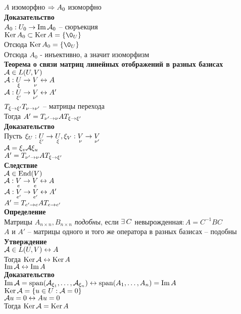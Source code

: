 \documentclass[12pt]{article}
\begin{document}
$A$ изоморфно $\Rightarrow A_0$ изоморфно\\
\textbf{Доказательство}\\
$A_0: U_0 \rightarrow \operatorname{Im} \mathcal{A}_0$ -- сюръекция\\
$\ker A_0 \subset \ker A = \{\0_U\}$\\
Отсюда $\ker A_0 = \{\0_U\}$\\
Отсюда $A_0$ - инъективно, а значит изоморфизм\\
\textbf{Теорема о связи матриц линейных отображений в разных базисах}\\
$\mathcal{A} \in L(U, V)$\\
$\mathcal{A}: \underset{\xi}{U} \rightarrow \underset{\nu}{V} \leftrightarrow A$\\
$\mathcal{A}: \underset{\xi'}{U} \rightarrow \underset{\nu'}{V} \leftrightarrow A'$\\
$T_{\xi \rightarrow \xi'} T_{\nu \rightarrow \nu'}$ -- матрицы перехода\\
Тогда $A' = T_{\nu' \rightarrow \nu} A T_{\xi \rightarrow \xi'}$\\
\textbf{Доказательство}\\
Пусть $\xi_U: \underset{\xi'}{U} \rightarrow \underset{\xi}{U},\\
\xi_V: \underset{\nu}{V} \rightarrow \underset{\nu'}{V}$\\
$\mathcal{A} = \xi_v \mathcal{A} \xi_u$\\
$A' = T_{\nu'\rightarrow \nu}AT_{\xi \rightarrow \xi'}$\\
\textbf{Следствие}\\
$\mathcal{A} \in \operatorname{End}(V)$\\
$\mathcal{A}: \underset{e}{V}\rightarrow\underset{e}{V} \leftrightarrow A$\\
$\mathcal{A}: \underset{e'}{V}\rightarrow\underset{e'}{V} \leftrightarrow A'$\\
$A'=T_{e'\rightarrow e}AT_{e\rightarrow e'}$\\
\textbf{Определение}\\
Матрицы $A_{n\times n},B_{n \times n}$ \textit{подобны}, если $\exists\, C$ невырожденная$: A=C^{-1}BC$\\
$A$ и $A'$ -- матрицы одного и того же оператора в разных базисах -- подобны\\
\textbf{Утверждение}\\
$\mathcal{A} \in L(U, V) \leftrightarrow A$\\
Тогда $\operatorname{Ker} \mathcal{A} \leftrightarrow \operatorname{Ker} A$\\
$\operatorname{Im} \mathcal{A} \leftrightarrow \operatorname{Im} A$\\
\textbf{Доказательство}\\
$\operatorname{Im} \mathcal{A} = \operatorname{span}(\mathcal{A}_{\xi_1},\ldots, \mathcal{A}_{\xi_n}) \leftrightarrow \operatorname{span}(A_1, \ldots, A_n) = \operatorname{Im} A$\\
$\operatorname{Ker} \mathcal{A} = \{ u\in U: \mathcal{A} = 0\}$\\
$\mathcal{A} u = 0 \leftrightarrow Au = 0$\\
Тогда $\operatorname{Ker} \mathcal{A} = \operatorname{Ker} A$
\end{document}

